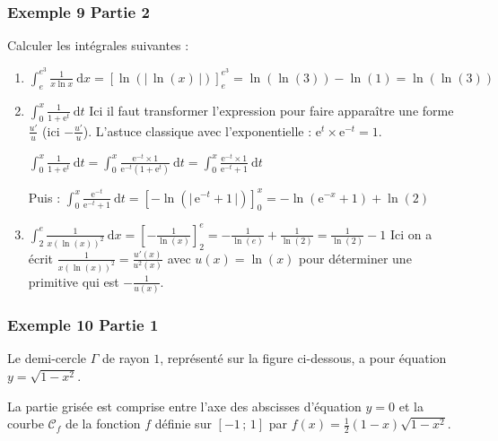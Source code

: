 \documentclass[11pt, hyperref={urlcolor=red,%
            linkcolor=blue, %
            colorlinks=true}]{beamer}
\newcommand {\axes} {
\draw[->,very thick] (\xmin,0) -- (\xmax,0);
\draw[->,very thick] (0,\ymin) -- (0,\ymax);
\draw (0.95*\xmax, 0) node[above] {$x$};
\draw (0, 0.95*\ymax) node[left] {$y$};
}
\newcommand {\fenetre}
{\clip (\xmin,\ymin) rectangle (\xmax,\ymax);}
\newcommand{\Interff}[2]{\left[#1\, ;\, #2\right]}
\newcommand{\courbe}[1]{\ensuremath{\mathcal{C}_{#1}}}
\newcommand{\dx}{\ensuremath{\text{d}x}}		%
\newcommand{\dt}{\ensuremath{\text{d}t}}		%
\newcommand{\valabs}[1]{\big| \, #1 \, \big|}
\begin{document}
\begin{frame}
\frametitle{Exemple  9 Partie 2}


Calculer les intégrales suivantes :

			\begin{enumerate}
						
				\item $\int_{e}^{e^3} \frac{1}{x \ln x} \ \dx = \left[\ln(\valabs{\ln(x)})\right]_{e}^{e^3}=\ln(\ln(3))- \ln(1)=\ln(\ln(3))$
				\item $\int_{0}^{x} \frac{1}{1+\text{e}^t}  \ \dt$ Ici il faut transformer l'expression pour faire apparaître une forme $\frac{u'}{u}$ (ici $-\frac{u'}{u}$). L'astuce classique avec l'exponentielle : $\text{e}^{t}\times \text{e}^{-t}=1$.

$\int_{0}^{x} \frac{1}{1+\text{e}^t}  \ \dt = \int_{0}^{x} \frac{\text{e}^{-t} \times 1}{\text{e}^{-t}(1+\text{e}^t)}  \ \dt =\int_{0}^{x} \frac{\text{e}^{-t} \times 1}{\text{e}^{-t}+1}  \ \dt$

Puis : 	$\int_{0}^{x} \frac{\text{e}^{-t}  }{\text{e}^{-t}+1}  \ \dt=\left[-\ln(\valabs{\text{e}^{-t}+1})\right]_{0}^{x}=-\ln(\text{e}^{-x}+1) + \ln(2)$

				
				\item $\int_{2}^{e} \frac{1}{x(\ln(x))^2}  \ \dx = \left[-\frac{1}{\ln(x)}\right]_{2}^{e}=-\frac{1}{\ln(e)}+\frac{1}{\ln(2)} =\frac{1}{\ln(2)}-1$ Ici on a écrit $\frac{1}{x(\ln(x))^2}=\frac{u'(x)}{u^{2}(x)}$ avec $u(x)=\ln(x)$ pour déterminer une primitive qui est $-\frac{1}{u(x)}$.
			\end{enumerate}

\end{frame}

\begin{frame}
\frametitle{Exemple  10 Partie  1}
\label{exemple10}


Le demi-cercle $\Gamma$ de rayon $1$, représenté sur la figure ci-dessous, a pour équation $y=\sqrt{1-x^2}$.

La partie grisée est comprise entre l'axe des abscisses d'équation $y=0$ et la courbe $\courbe{f}$ de la fonction $f$ définie sur  $\Interff{-1}{1}$ par 	$f(x)=\frac{1}{2}(1-x)\sqrt{1-x^2}$.

\begin{center}
\end{center}

\end{frame}
\end{document}
